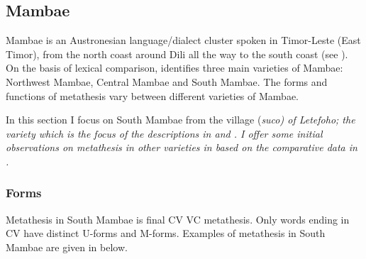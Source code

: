 

\subsection{Mambae}\label{sec:Mam} %
Mambae is an Austronesian language/dialect
cluster spoken in Timor-Leste (East Timor),
from the north coast around Dili all the way to the south coast (see ).
On the basis of lexical comparison, \citet{fo17}
identifies three main varieties of Mambae:
Northwest Mambae, Central Mambae and South Mambae.
The forms and functions of metathesis
vary between different varieties of Mambae.

In this section I focus on South Mambae
from the village (\it{suco}) of Letefoho;
the variety which is the focus of the descriptions in \cite{gr14} and \cite{fo17}.
I offer some initial observations on metathesis in other varieties
in  based on the comparative data in \cite{fo17}.

\subsubsection{Forms}
Metathesis in South Mambae is final CV {\ra} VC metathesis.
Only words ending in CV have distinct U-forms and M-forms.
Examples of metathesis in South Mambae are given in  below.

